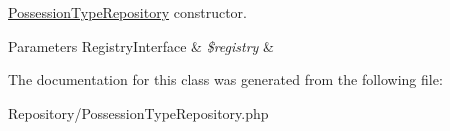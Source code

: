 \mbox{\hyperlink{class_app_1_1_repository_1_1_possession_type_repository}{Possession\+Type\+Repository}} constructor. 
\begin{DoxyParams}[1]{Parameters}
Registry\+Interface & {\em \$registry} & \\
\hline
\end{DoxyParams}


The documentation for this class was generated from the following file\+:\begin{DoxyCompactItemize}
\item 
Repository/Possession\+Type\+Repository.\+php\end{DoxyCompactItemize}
